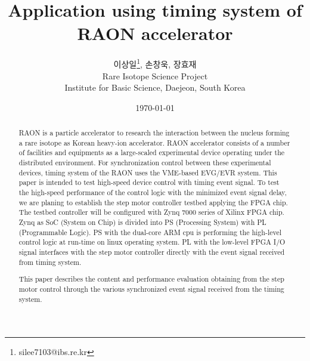 \documentclass[11pt
-  , a4paper
  , article
  , oneside
]{memoir}
\begin{document}
\newcommand{\technumber}{
  RAON Control-Document Series\\
  Revision : v1.0,   Release : 2015-10-12 fixed date}
\title{\textbf{Application using timing system of RAON accelerator}}

\author{이상일\thanks{silee7103@ibs.re.kr}, 손창욱, 장효재 \\

  Rare Isotope Science Project\\
  Institute for Basic Science, Daejeon, South Korea
}
\date{\today}

\renewcommand{\maketitlehooka}{\begin{flushright}\textsf{\technumber}\end{flushright}}

\maketitle

\begin{abstract}
RAON is a particle accelerator to research the interaction between the nucleus forming a rare isotope as Korean heavy-ion accelerator. RAON accelerator consists of a number of facilities and equipments as a large-scaled experimental device operating under the distributed environment. For synchronization control between these experimental devices, timing system of the RAON uses the VME-based EVG/EVR system. This paper is intended to test high-speed device control with timing event signal. To test the high-speed performance of the control logic with the minimized event signal delay, we are planing to establish the step motor controller testbed applying the FPGA chip. The testbed controller will be configured with Zynq 7000 series of Xilinx FPGA chip. Zynq as SoC (System on Chip) is divided into PS (Processing System) with PL (Programmable Logic). PS with the dual-core ARM cpu is performing the high-level control logic at run-time on linux operating system. PL with the low-level FPGA I/O signal interfaces with the step motor controller directly with the event signal received from timing system.

This paper describes the content and performance evaluation obtaining from the step motor control through the various synchronized event signal received from the timing system.
\end{abstract}
\end{document}
